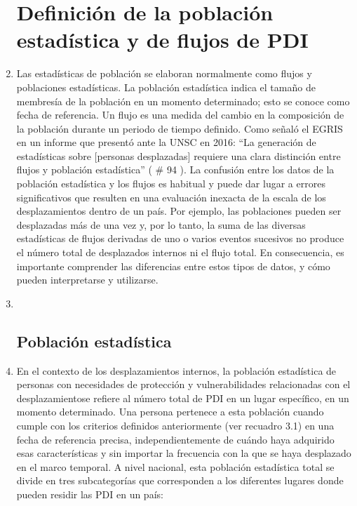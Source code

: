 \documentclass[
]{book}
\begin{document}
\begin{enumerate}
{  \section{Definición de la población estadística y de flujos de PDI}\label{definiciuxf3n-de-la-poblaciuxf3n-estaduxedstica-y-de-flujos-de-pdi}}
\item
  Las estadísticas de población se elaboran normalmente como flujos y poblaciones estadísticas. La población estadística indica el tamaño de membresía de la población en un momento determinado; esto se conoce como fecha de referencia. Un flujo es una medida del cambio en la composición de la población durante un periodo de tiempo definido. Como señaló el EGRIS en un informe que presentó ante la UNSC en 2016: ``La generación de estadísticas sobre {[}personas desplazadas{]} requiere una clara distinción entre flujos y población estadística'' (
  \# 94
  ). La confusión entre los datos de la población estadística y los flujos es habitual y puede dar lugar a errores significativos que resulten en una evaluación inexacta de la escala de los desplazamientos dentro de un país. Por ejemplo, las poblaciones pueden ser desplazadas más de una vez y, por lo tanto, la suma de las diversas estadísticas de flujos derivadas de uno o varios eventos sucesivos no produce el número total de desplazados internos ni el flujo total. En consecuencia, es importante comprender las diferencias entre estos tipos de datos, y cómo pueden interpretarse y utilizarse.
\item ~
  \hypertarget{poblaciuxf3n-estaduxedstica}{%
  \subsection{Población estadística}\label{poblaciuxf3n-estaduxedstica}}
\item
  En el contexto de los desplazamientos internos, la población estadística de personas con necesidades de protección y vulnerabilidades relacionadas con el desplazamientose refiere al número total de PDI en un lugar específico, en un momento determinado. Una persona pertenece a esta población cuando cumple con los criterios definidos anteriormente (ver recuadro 3.1) en una fecha de referencia precisa, independientemente de cuándo haya adquirido esas características y sin importar la frecuencia con la que se haya desplazado en el marco temporal. A nivel nacional, esta población estadística total se divide en tres subcategorías que corresponden a los diferentes lugares donde pueden residir las PDI en un país:
\end{enumerate}
\end{document}
